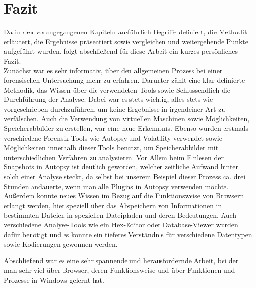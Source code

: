 \chapter{Fazit}

Da in den vorangegangenen Kapiteln ausführlich Begriffe definiert, die Methodik erläutert, die Ergebnisse präsentiert sowie vergleichen und weitergehende Punkte aufgeführt wurden, folgt abschließend für diese Arbeit ein kurzes persönliches Fazit. \\
Zunächst war es sehr informativ, über den allgemeinen Prozess bei einer forensischen Untersuchung mehr zu erfahren. Darunter zählt eine klar definierte Methodik, das Wissen über die verwendeten Tools sowie Schlussendlich die Durchführung der Analyse. Dabei war es stets wichtig, alles stets wie vorgeschrieben durchzuführen, um keine Ergebnisse in irgendeiner Art zu verfälschen. Auch die Verwendung von virtuellen Maschinen sowie Möglichkeiten, Speicherabbilder zu erstellen, war eine neue Erkenntnis. Ebenso wurden erstmals verschiedene Forensik-Tools wie Autopsy und Volatility verwendet sowie Möglichkeiten innerhalb dieser Tools benutzt, um Speicherabbilder mit unterschiedlichen Verfahren zu analysieren. Vor Allem beim Einlesen der Snapshots in Autopsy ist deutlich geworden, welcher zeitliche Aufwand hinter solch einer Analyse steckt, da selbst bei unserem Beispiel dieser Prozess ca. drei Stunden andauerte, wenn man alle Plugins in Autopsy verwenden möchte. Außerdem konnte neues Wissen im Bezug auf die Funktionsweise von Browsern erlangt werden, hier speziell über das Abspeichern von Informationen in bestimmten Dateien in speziellen Dateipfaden und deren Bedeutungen. Auch verschiedene Analyse-Tools wie ein Hex-Editor oder Database-Viewer wurden dafür benötigt und es konnte ein tieferes Verständnis für verschiedene Datentypen sowie Kodierungen gewonnen werden. 

Abschließend war es eine sehr spannende und herausfordernde Arbeit, bei der man sehr viel über Browser, deren Funktionsweise und über Funktionen und Prozesse in Windows gelernt hat. 
